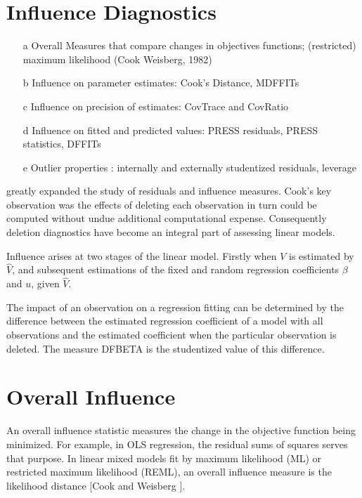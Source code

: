 \documentclass[12pt, a4paper]{report}
\theoremstyle{plain}
\theoremstyle{definition}
\theoremstyle{remark}
\begin{document}
	
	


	

	

\section{Influence Diagnostics}

\begin{itemize}
	\item[a] Overall Measures that compare changes in objectives functions; (restricted) maximum likelihood (Cook  Weisberg, 1982)
	\item[b] Influence on parameter estimates: Cook's Distance, MDFFITs
	\item[c] Influence on precision of estimates: CovTrace and CovRatio
	\item[d] Influence on fitted and predicted values: PRESS residuals, PRESS statistics, DFFITs
	\item[e] Outlier properties : internally and externally studentized residuals, leverage
\end{itemize}



\citet{cook77} greatly expanded the study of residuals and influence measures. Cook's key observation was the effects of deleting each observation in turn could be computed without undue additional computational expense. Consequently deletion diagnostics have become an integral part of assessing linear models.

Influence arises at two stages of the linear model. Firstly when $V$ is estimated by $\hat{V}$, and subsequent
estimations of the fixed and random regression coefficients $\beta$ and $u$, given $\hat{V}$.

The impact of an observation on a regression fitting can be determined by the difference between the estimated regression coefficient of a model with all observations and the estimated coefficient when the particular observation is deleted. The measure DFBETA is the studentized value of this difference.


\section{Overall Influence}
An overall influence statistic measures the change in the objective function being minimized. For example, in
OLS regression, the residual sums of squares serves that purpose. In linear mixed models fit by
 maximum likelihood (ML) or  restricted maximum likelihood (REML), an overall influence measure is the  likelihood distance [Cook and Weisberg ].
\end{document}
